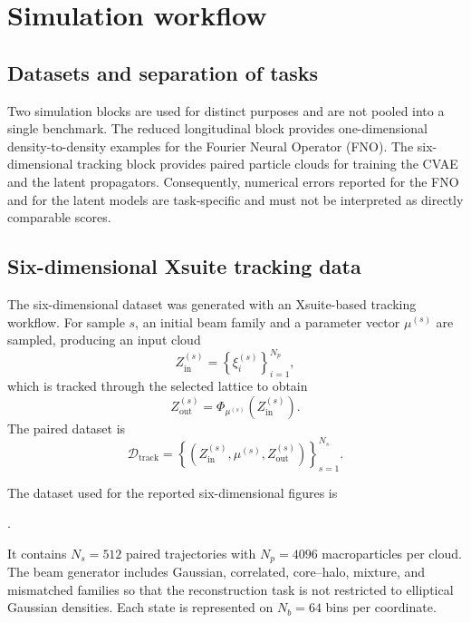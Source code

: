 \section{Simulation workflow}
\label{sec:simulation_workflow}

\subsection{Datasets and separation of tasks}

Two simulation blocks are used for distinct purposes and are not pooled into a single benchmark. The reduced longitudinal block provides one-dimensional density-to-density examples for the Fourier Neural Operator (FNO). The six-dimensional tracking block provides paired particle clouds for training the CVAE and the latent propagators. Consequently, numerical errors reported for the FNO and for the latent models are task-specific and must not be interpreted as directly comparable scores.

\subsection{Six-dimensional Xsuite tracking data}

The six-dimensional dataset was generated with an Xsuite-based tracking workflow. For sample $s$, an initial beam family and a parameter vector $\mu^{(s)}$ are sampled, producing an input cloud
\begin{equation}
    Z_{\mathrm{in}}^{(s)}
    =
    \left\{\xi_i^{(s)}\right\}_{i=1}^{N_p},
\end{equation}
which is tracked through the selected lattice to obtain
\begin{equation}
    Z_{\mathrm{out}}^{(s)}
    =
    \Phi_{\mu^{(s)}}\!\left(Z_{\mathrm{in}}^{(s)}\right).
\end{equation}
The paired dataset is
\begin{equation}
    \mathcal{D}_{\mathrm{track}}
    =
    \left\{
        \left(
            Z_{\mathrm{in}}^{(s)},
            \mu^{(s)},
            Z_{\mathrm{out}}^{(s)}
        \right)
    \right\}_{s=1}^{N_s}.
    \label{eq:tracking_dataset_revised}
\end{equation}

The dataset used for the reported six-dimensional figures is
\begin{center}
    \small{}.
\end{center}
It contains $N_s=512$ paired trajectories with $N_p=4096$ macroparticles per cloud. The beam generator includes Gaussian, correlated, core--halo, mixture, and mismatched families so that the reconstruction task is not restricted to elliptical Gaussian densities. Each state is represented on $N_b=64$ bins per coordinate.

